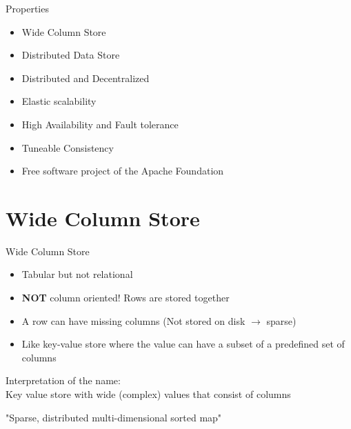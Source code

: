 \documentclass[
  10pt
]{beamer}
\begin{document}
\begin{frame}{Properties}
  \begin{itemize}
    \item<1-> Wide Column Store
    \item<2-> Distributed Data Store
    \item<3-> Distributed and Decentralized
    \item<4-> Elastic scalability
    \item<5-> High Availability and Fault tolerance
    \item<6-> Tuneable Consistency
    \item<7-> Free software project of the Apache Foundation

  \end{itemize}
\end{frame}

\section{Wide Column Store}  %
\begin{frame}{Wide Column Store}
  \begin{itemize}
    \item<1-> Tabular but not relational
    \item<2-> \textbf{NOT} column oriented! Rows are stored together
    \item<3-> A row can have missing columns (Not stored on disk $\rightarrow$ sparse)
    \item<4-> Like key-value store where the value can have a subset of a predefined set of columns
  \end{itemize}

  Interpretation of the name: \\
  Key value store with wide (complex) values that consist of columns

  "Sparse, distributed multi-dimensional sorted map"

\end{frame}
\end{document}
